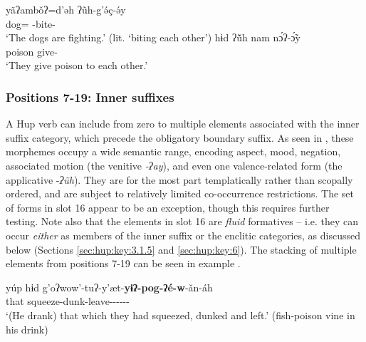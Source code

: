 \documentclass[output=paper]{langscibook}
\begin{document}
\ea\label{ex:hup:key:7} 
    \ea\label{ex:hup:key:7a}{
    \gll yãʔambǒʔ=d'ǝh ʔ\~uh-g'ǝ́ç-ǝ́y\\ 
    dog=\Pl{} \Intrc{}-bite-\Dynm{}\\ 
    \glt `The dogs are fighting.' (lit. `biting each other')
    }
    \ex\label{ex:hup:key:7b}{
    \gll hɨd ʔũ̌h nam nɔ́ʔ-ɔ̃́y \\ 
    \Third\Sg{} \Intrc{} poison give-\Dynm{}\\ 
    \glt `They give poison to each other.'
    }
    \z 
\z 


\subsubsection{Positions 7-19: Inner suffixes} 
\label{sec:hup:key:3.1.3}

A Hup verb can include from zero to multiple elements associated with the inner suffix category, which precede the obligatory boundary suffix. As seen in , these morphemes occupy a wide semantic range, encoding aspect, mood, negation, associated motion (the venitive \textit{{}-ʔay}), and even one valence-related form (the applicative -\textit{ʔ\~uh}). They are for the most part templatically rather than scopally ordered, and are subject to relatively limited co-occurrence restrictions. The set of forms in slot 16 appear to be an exception, though this requires further testing. Note also that the elements in slot 16 are \textit{fluid} formatives – i.e. they can occur \textit{either} as members of the inner suffix or the enclitic categories, as discussed below (Sections \ref{sec:hup:key:3.1.5} and \ref{sec:hup:key:6}). The stacking of multiple elements from positions 7-19 can be seen in example .

\ea\label{ex:hup:key:8} 
\gll yúp hɨd g'oʔwow'-tuʔ-y'æt-\textbf{yɨʔ-pog-ʔé-w}-ǎn-áh\\ 
that \Third\Pl{} squeeze-dunk-leave-\textbf{\Tel{}}-\textbf{\Emph{}}-\textbf{\Pfv{}}-\textbf{\Fill{}}-\Obj{}-\Decl{} \\ 
\glt `(He drank) that which they had squeezed, dunked and left.' (fish-poison vine in his drink)
\z 

\end{document}
